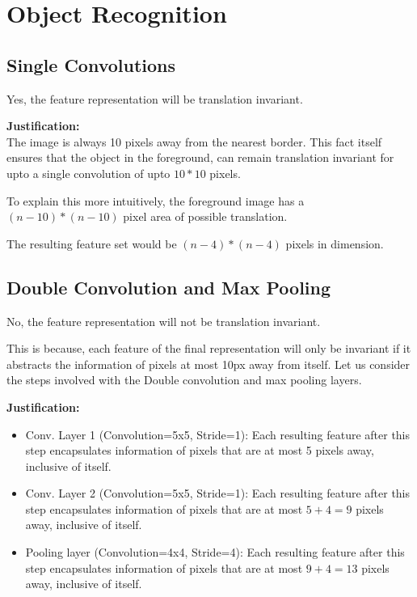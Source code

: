 \documentclass[parskip=half]{scrartcl}
\begin{document}
\section{Object Recognition} %
\label{sec:object_recognition}

    \subsection{Single Convolutions} %
    \label{sub:single_convolutions}

        Yes, the feature representation will be translation invariant.

        \textbf{Justification:}\\
        The image is always 10 pixels away from the nearest border. This fact itself ensures that the object in the foreground, can remain translation invariant for upto a single convolution of upto $10*10$ pixels.

        To explain this more intuitively, the foreground image has a $(n-10)*(n-10)$ pixel area of possible translation.

        The resulting feature set would be $(n-4)*(n-4)$ pixels in dimension.
    


    \subsection{Double Convolution and Max Pooling} %
    \label{sub:double_convolution_and_max_pooling}

        No, the feature representation will not be translation invariant.

        This is because, each feature of the final representation will only be invariant if it abstracts the information of pixels at most 10px away from itself. Let us consider the steps involved with the Double convolution and max pooling layers.

        \textbf{Justification:}\\
        \begin{itemize}
            \item 
            Conv. Layer 1 (Convolution=5x5, Stride=1): Each resulting feature after this step encapsulates information of pixels that are at most 5 pixels away, inclusive of itself. 
            \item 
            Conv. Layer 2 (Convolution=5x5, Stride=1): Each resulting feature after this step encapsulates information of pixels that are at most $5 + 4 = 9$ pixels away, inclusive of itself.
            \item 
            Pooling layer (Convolution=4x4, Stride=4): Each resulting feature after this step encapsulates information of pixels that are at most $9 + 4 = 13$ pixels away, inclusive of itself.
        \end{itemize}
\end{document}
